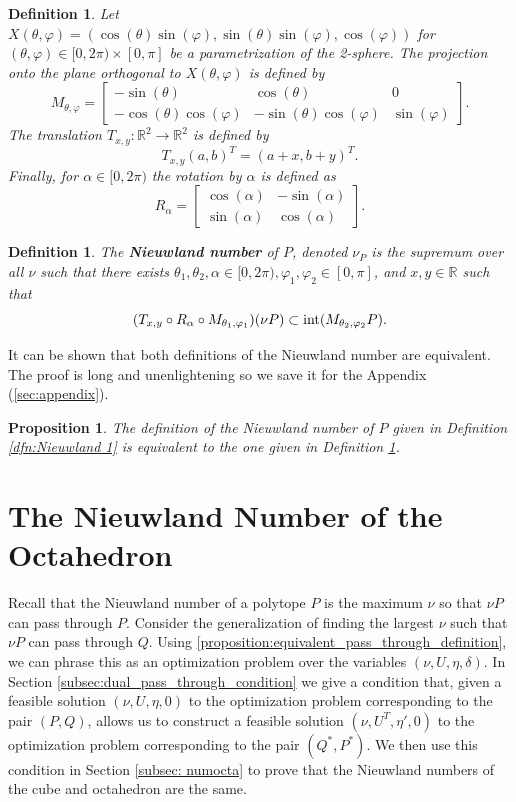 \documentclass[a4paper]{amsart}
\newtheorem{prop}[thm]{Proposition}
\newtheorem{dfn}[thm]{Definition}
\renewcommand{\phi}{\varphi}
\theoremstyle{remark}
\begin{document}
\begin{dfn}
	Let $X(\theta,\phi)=(\cos(\theta)\sin(\phi),\sin(\theta)\sin(\phi),\cos(\phi))$ for $(\theta,\phi)\in[0,2\pi)\times[0,\pi]$ be a parametrization of the 2-sphere. The projection onto the plane orthogonal to $X(\theta,\phi)$ is defined by 
		$$M_{\theta,\phi}=\begin{bmatrix}
		-\sin(\theta) & \cos(\theta) & 0\\
		-\cos(\theta)\cos(\phi) & -\sin(\theta)\cos(\phi) & \sin(\phi)
		\end{bmatrix}.
		$$
	The translation $T_{x,y}:\mathbb{R}^2\to\mathbb{R}^2$ is defined by $$T_{x,y}(a,b)^T=(a+x,b+y)^T.$$
	Finally, for $\alpha\in [0,2\pi)$ the rotation by $\alpha$ is defined as 
        $$R_\alpha =\begin{bmatrix}
        \cos(\alpha) & -\sin(\alpha)\\
        \sin(\alpha) & \cos(\alpha)
        \end{bmatrix}.
        $$
\end{dfn}
\begin{dfn} \label{dfn: Nieuwland 2}
    The \textbf{Nieuwland number} of $P$, denoted $\nu_P$ is the supremum over all $\nu$ such that there exists $\theta_1,\theta_2,\alpha\in[0,2\pi),\phi_1,\phi_2\in[0,\pi]$, and $x,y\in\mathbb{R}$ such that
        $$(T_{x,y}\circ R_\alpha\circ M_{\theta_1,\phi_1})(\nu P)\subset \textup{int}(M_{\theta_2,\phi_2} P).$$
\end{dfn}
\noindent
It can be shown that both definitions of the Nieuwland number are equivalent. The proof is long and unenlightening so we save it for the Appendix (\ref{sec:appendix}).
\begin{prop} \label{prop: appendix}
	The definition of the Nieuwland number of $P$ given in Definition \ref{dfn:Nieuwland 1} is equivalent to the one given in Definition \ref{dfn: Nieuwland 2}.
\end{prop}

\section{The Nieuwland Number of the Octahedron} \label{sec:dual_pass_through_condition}

Recall that the Nieuwland number of a polytope $P$ is the maximum $\nu$ so that $\nu P$ can pass through $P$. Consider the generalization of finding the largest $\nu$ such that $\nu P$ can pass through $Q$. Using \ref{proposition:equivalent_pass_through_definition}, we can phrase this as an optimization problem over the variables $(\nu, U, \eta, \delta)$. In Section \ref{subsec:dual_pass_through_condition} we give a condition that, given a feasible solution $(\nu,U,\eta,0)$ to the optimization problem corresponding to the pair $(P,Q)$, allows us to construct a feasible solution $(\nu,U^T,\eta',0)$ to the optimization problem corresponding to the pair $(Q^*,P^*)$. We then use this condition in Section \ref{subsec: numocta} to prove that the Nieuwland numbers of the cube and octahedron are the same.
\\
\end{document}

